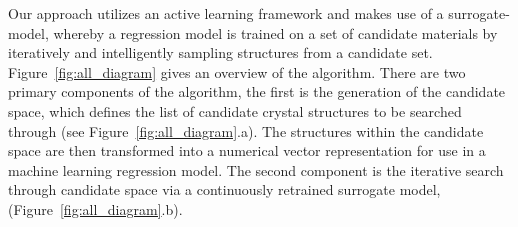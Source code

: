 %
%
%
%
%



%
%
%
Our approach utilizes an active learning framework and makes use of a surrogate-model,
whereby a regression model is trained on a set of candidate materials by iteratively and intelligently sampling structures from a candidate set.
%
Figure~\ref{fig:all_diagram} gives an overview of the algorithm.%
%
There are two primary components of the algorithm, the first is the generation of the candidate space,
which defines the list of candidate crystal structures to be searched through (see Figure~\ref{fig:all_diagram}.a).
%
The structures within the candidate space are then transformed into a numerical vector representation for use in  a machine learning regression model.
%
The second component is the iterative search through candidate space via a continuously retrained surrogate model, (Figure~\ref{fig:all_diagram}.b).

